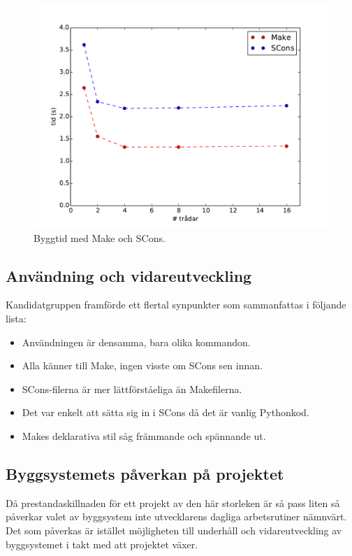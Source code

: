 \begin{figure}[h!]
  \centering
  \includegraphics[scale=0.6]{yngve-tex/grafik/prestanda.pdf}
  \caption{Byggtid med Make och SCons.}
  \label{fig:prestanda}
\end{figure}

\FloatBarrier

\subsection{Användning och vidareutveckling}
Kandidatgruppen framförde ett flertal synpunkter som sammanfattas i följande lista:

\begin{itemize}
  \item Användningen är densamma, bara olika kommandon.
  \item Alla känner till Make, ingen visste om SCons sen innan.
  \item SCons-filerna är mer lättförståeliga än Makefilerna.
  \item Det var enkelt att sätta sig in i SCons då det är vanlig Pythonkod.
  \item Makes deklarativa stil såg främmande och spännande ut.
\end{itemize}

\subsection{Byggsystemets påverkan på projektet}
Då prestandaskillnaden för ett projekt av den här storleken är så pass liten så påverkar valet av byggsystem inte utvecklarens dagliga arbetsrutiner nämnvärt. Det som påverkas är istället möjligheten till underhåll och vidareutveckling av byggsystemet i takt med att projektet växer. 

